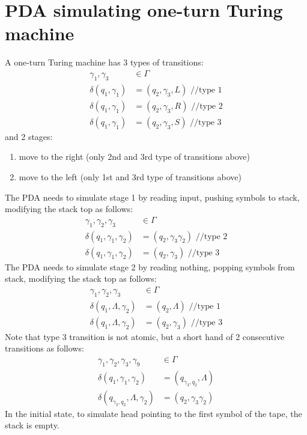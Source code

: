 \documentclass{article}
\begin{document}
\section{PDA simulating one-turn Turing machine}
 A one-turn Turing machine has 3 types of transitions:
\begin{align*}
\gamma_1, \gamma_3 &\in \Gamma\\
\delta(q_1, \gamma_1) &= (q_2, \gamma_3, L) \text{ //type 1}\\
\delta(q_1, \gamma_1) &= (q_2, \gamma_3, R) \text{ //type 2}\\
\delta(q_1, \gamma_1) &= (q_2, \gamma_3, S) \text{ //type 3}
\end{align*}
and 2 stages:
\begin{enumerate}
  \item move to the right (only 2nd and 3rd type of transitions above)
  \item move to the left (only 1st and 3rd type of transitions above)
\end{enumerate}
The PDA needs to simulate stage 1 by reading input, pushing symbols to stack,
modifying the stack top as follows:
\begin{align*}
\gamma_1, \gamma_2, \gamma_3 &\in \Gamma\\
\delta(q_1, \gamma_1, \gamma_2) &= (q_2, \gamma_3 \gamma_2) \text{ //type 2}\\
\delta(q_1, \gamma_1, \gamma_2) &= (q_2, \gamma_3) \text{ //type 3}
\end{align*}
The PDA needs to simulate stage 2 by reading nothing, popping symbols from
stack, modifying the stack top as follows:
\begin{align*}
\gamma_1, \gamma_2, \gamma_3 &\in \Gamma\\
\delta(q_1, \Lambda, \gamma_2) &= (q_2, \Lambda) \text{ //type 1}\\
\delta(q_1, \Lambda, \gamma_2) &= (q_2, \gamma_3) \text{ //type 3}
\end{align*}
Note that type 3 transition is not atomic, but a short hand of 2 consecutive
transitions as follows:
\begin{align*}
\gamma_1, \gamma_2, \gamma_3, \gamma_9 &\in \Gamma\\
\delta(q_1, \gamma_1, \gamma_2) &= (q_{\gamma_3, q_2}, \Lambda)\\
\delta(q_{\gamma_3, q_2}, \Lambda, \gamma_2) &= (q_2, \gamma_3\gamma_2)
\end{align*}
In the initial state, to simulate head pointing to the first symbol of the tape,
the stack is empty.
\end{document}
